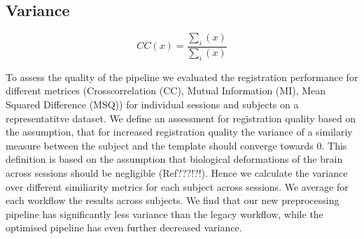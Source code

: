 
\begin{sansmath}
\end{sansmath}

\subsection{Variance}

\[ CC(x) = \frac{\sum_i{(x)}}{\sum_i{(x)}} \]


To assess the quality of the pipeline we evaluated the registration performance for different metrices (Crosscorrelation (CC), Mutual Information (MI), Mean Squared Difference (MSQ)) for individual sessions and subjects on a representatitve dataset.  We define an assessment for registration quality based on the assumption, that for increased registration quality the variance of a similariy measure between the subject and the template should converge towards 0. This definition is based on the assumption that biological deformations of the brain across sessions should be negligible (Ref???!?!). Hence we calculate the variance over different similiarity metrics for each subject across sessions. We average for each workflow the results across subjects. We find that our new preprocessing pipeline has significantly less variance than the legacy workflow, while the optimised pipeline has even further decreased variance.
